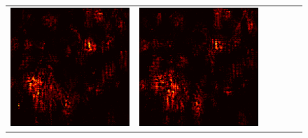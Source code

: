 \documentclass[preprint,12pt]{elsarticle}
\begin{document}
\begin{figure}[p]
\begin{tabular}{cccccc}
  \includegraphics[scale=\scale]{../visualizations/examples/imagenette/cnn/active_saliency_map/7.png} & 
  \includegraphics[scale=\scale]{../visualizations/examples/imagenette/cnn/inactive_saliency_map/7.png} \\
  

\end{tabular}
\end{figure}
\end{document}
